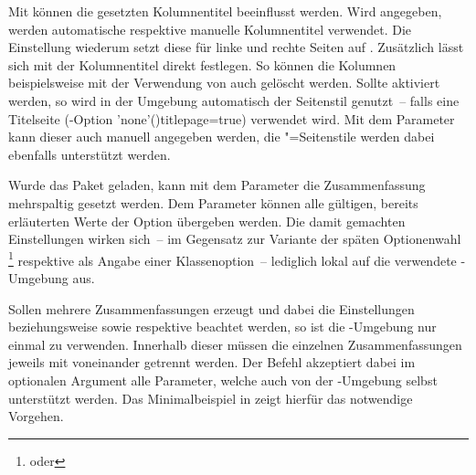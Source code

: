 \begin{DeclareEntity*}{}
\begin{DeclareEntity*}{}
\begin{DeclareEntity*}{}
\begin{Declaration}
\begin{Declaration}
\begin{Declaration}
\begin{Declaration}
\begin{Declaration}
\begin{Declaration}
\begin{Declaration}
%
%
Mit  können die gesetzten Kolumnentitel 
beeinflusst werden. Wird  
angegeben, werden automatische respektive manuelle Kolumnentitel verwendet. Die 
Einstellung  wiederum setzt diese 
für linke und rechte Seiten auf . Zusätzlich lässt sich mit 
 der 
Kolumnentitel direkt festlegen. So können die Kolumnen beispielsweise mit der 
Verwendung von  auch 
gelöscht werden. Sollte  aktiviert 
werden, so wird in der Umgebung automatisch der Seitenstil  
genutzt~-- falls eine Titelseite
(\KOMAScript-Option \Option'none'(){titlepage=true}) 
verwendet wird. Mit dem Parameter  kann 
dieser auch manuell angegeben werden, die "=Seitenstile 
werden dabei ebenfalls unterstützt werden.

%
Wurde das Paket  geladen, kann mit dem Parameter 
 die Zusammenfassung 
mehrspaltig gesetzt werden. Dem Parameter  
können alle gültigen, bereits erläuterten Werte der Option  
übergeben werden. Die damit gemachten Einstellungen wirken sich~-- im Gegensatz 
zur Variante der späten Optionenwahl%
\footnote{%
   oder
}
respektive als Angabe einer Klassenoption~-- lediglich lokal auf die verwendete 
-Umgebung aus.

%
Sollen mehrere Zusammenfassungen erzeugt und dabei die Einstellungen 
 beziehungsweise  sowie 
 respektive  beachtet werden, so 
ist die -Umgebung nur einmal zu verwenden. Innerhalb 
dieser müssen die einzelnen Zusammenfassungen jeweils mit  
voneinander getrennt werden. Der Befehl akzeptiert dabei im optionalen Argument 
alle Parameter, welche auch von der -Umgebung selbst 
unterstützt werden. Das Minimalbeispiel in  
zeigt hierfür das notwendige Vorgehen.


\end{Declaration}
\end{Declaration}
\end{Declaration}
\end{Declaration}
\end{Declaration}
\end{Declaration}
\end{Declaration}
\end{DeclareEntity*}
\end{DeclareEntity*}
\end{DeclareEntity*}
